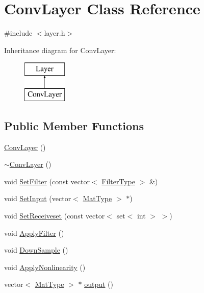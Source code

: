 \hypertarget{class_conv_layer}{\section{Conv\+Layer Class Reference}
\label{class_conv_layer}
}


{\ttfamily \#include $<$layer.\+h$>$}

Inheritance diagram for Conv\+Layer\+:\begin{figure}[H]
\begin{center}
\leavevmode
\includegraphics[height=2.000000cm]{class_conv_layer}
\end{center}
\end{figure}
\subsection*{Public Member Functions}
\begin{DoxyCompactItemize}
\item 
\hyperlink{class_conv_layer_a791713b4ac5619f2cc20a20cb64ea885}{Conv\+Layer} ()
\item 
\hyperlink{class_conv_layer_a277fbb31369014bcb607c51f52c61032}{$\sim$\+Conv\+Layer} ()
\item 
void \hyperlink{class_conv_layer_a16a423c0e8ce590ab4757819159b015c}{Set\+Filter} (const vector$<$ \hyperlink{utils_8h_a3b3705cad4e05c49adc293c96d0db7d1}{Filter\+Type} $>$ \&)
\item 
void \hyperlink{class_conv_layer_a585102c25508332b6ab2799409393204}{Set\+Input} (vector$<$ \hyperlink{utils_8h_a87f2f26b431d56aa72b3d4d6cd5c6f62}{Mat\+Type} $>$ $\ast$)
\item 
void \hyperlink{class_conv_layer_aa2c01fc18b295fc3ddf2d48497653206}{Set\+Receiveset} (const vector$<$ set$<$ int $>$ $>$)
\item 
void \hyperlink{class_conv_layer_a70111098046a07416fcbdffdbe8f0cfd}{Apply\+Filter} ()
\item 
void \hyperlink{class_conv_layer_a8970249425ba935d91bc0f0a530ea13c}{Down\+Sample} ()
\item 
void \hyperlink{class_conv_layer_a5e5a5da58cb21ca2894ecf55088a2636}{Apply\+Nonlinearity} ()
\item 
vector$<$ \hyperlink{utils_8h_a87f2f26b431d56aa72b3d4d6cd5c6f62}{Mat\+Type} $>$ $\ast$ \hyperlink{class_conv_layer_aaaa781f9699133fe8b7d1d1e5f090a6e}{output} ()
\end{DoxyCompactItemize}
